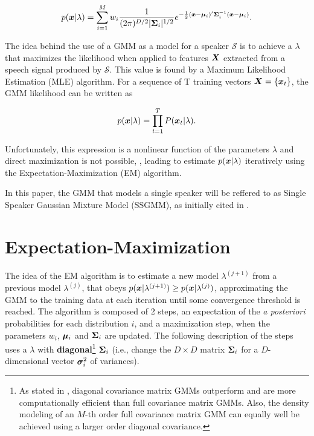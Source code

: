 \begin{equation}
    \postpdf{\dvec{x}}{\lambda} = \dgaussianmixture.
    \label{eq:likelihood_gmm}
\end{equation}

The idea behind the use of a GMM as a model for a speaker $\mathcal{S}$ is to achieve a $\lambda$ that maximizes the likelihood when applied to features $\boldsymbol{X}$ extracted from a speech signal produced by $\mathcal{S}$. This value is found by a Maximum Likelihood Estimation (MLE) algorithm. For a sequence of T training vectors $\boldsymbol{X} = \{\boldsymbol{x}_t\}$, the GMM likelihood can be written as

\begin{equation}
    \postpdf{\dvec{x}}{\lambda} = \prod_{t=1}^T \postprob{\dvec{x}_t}{\lambda}.
    \label{eq:likelihood_gmm_mle}
\end{equation}

\noindent Unfortunately, this expression is a nonlinear function of the parameters $\lambda$ and direct maximization is not possible, , leading to estimate $p(\boldsymbol{x}|\lambda)$ iteratively using the Expectation-Maximization (EM) algorithm.

In this paper, the GMM that models a single speaker will be reffered to as Single Speaker Gaussian Mixture Model (SSGMM), as initially cited in .

\section{Expectation-Maximization}
\label{sec:em}

The idea of the EM algorithm is to estimate a new model $\lambda^{(j+1)}$ from a previous model $\lambda^{(j)}$, that obeys $p(\boldsymbol{x}|\lambda^{(j+1)}) \geq p(\boldsymbol{x}|\lambda^{(j)})$, approximating the GMM to the training data at each iteration until some convergence threshold is reached. The algorithm is composed of 2 steps, an expectation of the \emph{a posteriori} probabilities for each distribution $i$, and a maximization step, when the parameters $w_i$, $\boldsymbol{\mu}_i$ and $\boldsymbol{\Sigma}_i$ are updated. The following description of the steps uses a $\lambda$ with \textbf{diagonal}\footnote{As stated in , diagonal covariance matrix GMMs outperform and are more computationally efficient than full covariance matrix GMMs. Also, the density modeling of an $M$-th order full covariance matrix GMM can equally well be achieved using a larger order diagonal covariance.} $\boldsymbol{\Sigma}_i$ (i.e., change the $D \times D$ matrix $\boldsymbol{\Sigma}_i$ for a $D$-dimensional vector $\boldsymbol{\sigma}_i^2$ of variances).

